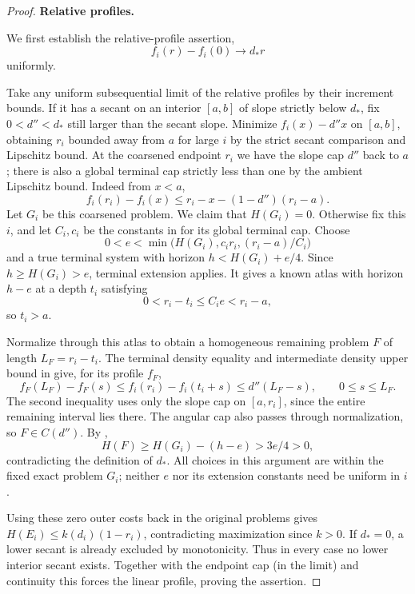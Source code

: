 \begin{proof}
\par\smallskip\noindent\textbf{Relative profiles.}\quad

We first establish the relative-profile assertion,
\begin{equation}
f_i(r)-f_i(0)\longrightarrow d_* r
\end{equation}
uniformly.

Take any uniform subsequential limit of the relative profiles by their increment bounds. If it has a secant on an interior \([a,b]\) of slope strictly below \(d_*\), fix \(0<d''<d_*\) still larger than the secant slope. Minimize \(f_i(x)-d''x\) on \([a,b]\), obtaining \(r_i\) bounded away from \(a\) for large \(i\) by the strict secant comparison and Lipschitz bound. At the coarsened endpoint \(r_i\) we have the slope cap \(d''\) back to \(a\); there is also a global terminal cap strictly less than one by the ambient Lipschitz bound. Indeed from \(x<a\),
\begin{equation}
f_i(r_i)-f_i(x)\le r_i-x-(1-d'')(r_i-a).
\end{equation}
Let \(G_i\) be this coarsened problem.  We claim that \(H(G_i)=0\).
Otherwise fix this \(i\), and let \(C_i,c_i\) be the constants in
 for its global terminal cap.
Choose
\[
 0<e<\min\bigl(H(G_i),c_i r_i,(r_i-a)/C_i\bigr)
\]
and a true terminal system with horizon \(h<H(G_i)+e/4\).
Since \(h\ge H(G_i)>e\), terminal extension applies.  It gives
a known atlas with horizon \(h-e\) at a depth \(t_i\) satisfying
\[
 0<r_i-t_i\le C_i e<r_i-a,
\]
so \(t_i>a\).

Normalize through this atlas to obtain a homogeneous remaining
problem \(F\) of length \(L_F=r_i-t_i\).  The terminal density
equality and intermediate density upper bound in
 give, for its profile \(f_F\),
\[
 f_F(L_F)-f_F(s)
 \le f_i(r_i)-f_i(t_i+s)
 \le d''(L_F-s),\qquad 0\le s\le L_F.
\]
The second inequality uses only the slope cap on \([a,r_i]\),
since the entire remaining interval lies there.  The angular cap
also passes through normalization, so \(F\in C(d'')\).
By ,
\[
 H(F)\ge H(G_i)-(h-e)>3e/4>0,
\]
contradicting the definition of \(d_*\).  All choices in this
argument are within the fixed exact problem \(G_i\); neither
\(e\) nor its extension constants need be uniform in \(i\).

Using these zero outer costs back in the original problems gives \(H(E_i)\le k(d_i)(1-r_i)\), contradicting maximization since \(k>0\). If \(d_*=0\), a lower secant is already excluded by monotonicity.  Thus in every case no lower interior secant exists. Together with the endpoint cap (in the limit) and continuity this forces the linear profile, proving the assertion.


\end{proof}
